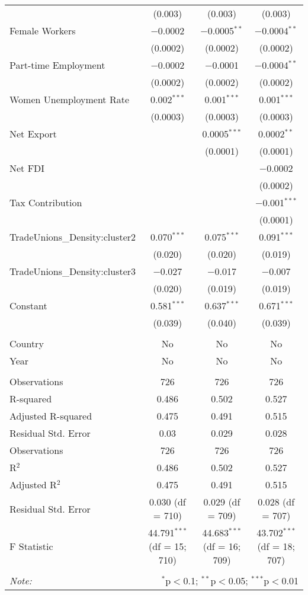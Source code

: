 \begin{table}[!htbp]
\begin{tabular}{@{\extracolsep{5pt}}lccc}
  & (0.003) & (0.003) & (0.003) \\ 
  Female Workers & $-$0.0002 & $-$0.0005$^{**}$ & $-$0.0004$^{**}$ \\ 
  & (0.0002) & (0.0002) & (0.0002) \\ 
  Part-time Employment & $-$0.0002 & $-$0.0001 & $-$0.0004$^{**}$ \\ 
  & (0.0002) & (0.0002) & (0.0002) \\ 
  Women Unemployment Rate & 0.002$^{***}$ & 0.001$^{***}$ & 0.001$^{***}$ \\ 
  & (0.0003) & (0.0003) & (0.0003) \\ 
  Net Export &  & 0.0005$^{***}$ & 0.0002$^{**}$ \\ 
  &  & (0.0001) & (0.0001) \\ 
  Net FDI &  &  & $-$0.0002 \\ 
  &  &  & (0.0002) \\ 
  Tax Contribution &  &  & $-$0.001$^{***}$ \\ 
  &  &  & (0.0001) \\ 
  TradeUnions\_Density:cluster2 & 0.070$^{***}$ & 0.075$^{***}$ & 0.091$^{***}$ \\ 
  & (0.020) & (0.020) & (0.019) \\ 
  TradeUnions\_Density:cluster3 & $-$0.027 & $-$0.017 & $-$0.007 \\ 
  & (0.020) & (0.019) & (0.019) \\ 
  Constant & 0.581$^{***}$ & 0.637$^{***}$ & 0.671$^{***}$ \\ 
  & (0.039) & (0.040) & (0.039) \\ 
 \hline \\[-1.8ex] 
Country & No & No & No \\ 
Year & No & No & No \\ 
\hline \\[-1.8ex] 
Observations & 726 & 726 & 726 \\ 
R-squared & 0.486 & 0.502 & 0.527 \\ 
Adjusted R-squared & 0.475 & 0.491 & 0.515 \\ 
Residual Std. Error & 0.03 & 0.029 & 0.028 \\ 
Observations & 726 & 726 & 726 \\ 
R$^{2}$ & 0.486 & 0.502 & 0.527 \\ 
Adjusted R$^{2}$ & 0.475 & 0.491 & 0.515 \\ 
Residual Std. Error & 0.030 (df = 710) & 0.029 (df = 709) & 0.028 (df = 707) \\ 
F Statistic & 44.791$^{***}$ (df = 15; 710) & 44.683$^{***}$ (df = 16; 709) & 43.702$^{***}$ (df = 18; 707) \\ 
\hline 
\hline \\[-1.8ex] 
\textit{Note:}  & \multicolumn{3}{r}{$^{*}$p$<$0.1; $^{**}$p$<$0.05; $^{***}$p$<$0.01} \\ 
\end{tabular} 
\end{table} 
